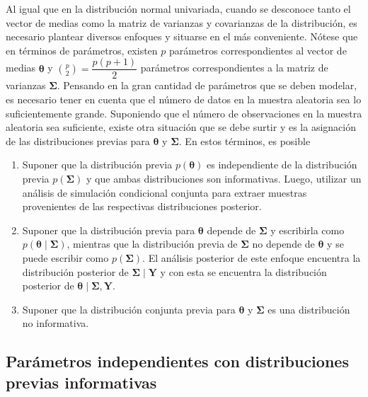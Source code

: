 \documentclass[
  10pt,
  spanish,
]{book}
\providecommand{\tightlist}{%
  \setlength{\itemsep}{0pt}\setlength{\parskip}{0pt}}
\theoremstyle{definition}
\theoremstyle{definition}
\theoremstyle{definition}
\theoremstyle{definition}
\theoremstyle{remark}
\begin{document}
Al igual que en la distribución normal univariada, cuando se desconoce tanto el vector de medias como la matriz de varianzas y covarianzas de la distribución, es necesario plantear diversos enfoques y situarse en el más conveniente. Nótese que en términos de parámetros, existen \(p\) parámetros correspondientes al vector de medias \(\boldsymbol \theta\) y \(\binom{p}{2}=\dfrac{p(p+1)}{2}\) parámetros correspondientes a la matriz de varianzas \(\boldsymbol \Sigma\). Pensando en la gran cantidad de parámetros que se deben modelar, es necesario tener en cuenta que el número de datos en la muestra aleatoria sea lo suficientemente grande. Suponiendo que el número de observaciones en la muestra aleatoria sea suficiente, existe otra situación que se debe surtir y es la asignación de las distribuciones previas para \(\boldsymbol \theta\) y \(\boldsymbol \Sigma\). En estos términos, es posible

\begin{enumerate}
\def\labelenumi{\arabic{enumi}.}
\tightlist
\item
  Suponer que la distribución previa \(p(\boldsymbol \theta)\) es independiente de la distribución previa \(p(\boldsymbol \Sigma)\) y que ambas distribuciones son informativas. Luego, utilizar un análisis de simulación condicional conjunta para extraer muestras provenientes de las respectivas distribuciones posterior.
\item
  Suponer que la distribución previa para \(\boldsymbol \theta\) depende de \(\boldsymbol \Sigma\) y escribirla como \(p(\boldsymbol \theta\mid \boldsymbol \Sigma)\), mientras que la distribución previa de \(\boldsymbol \Sigma\) no depende de \(\boldsymbol \theta\) y se puede escribir como \(p(\boldsymbol \Sigma)\). El análisis posterior de este enfoque encuentra la distribución posterior de \(\boldsymbol \Sigma\mid \mathbf{Y}\) y con esta se encuentra la distribución posterior de \(\boldsymbol \theta\mid \boldsymbol \Sigma,\mathbf{Y}\).
\item
  Suponer que la distribución conjunta previa para \(\boldsymbol \theta\) y \(\boldsymbol \Sigma\) es una distribución no informativa.
\end{enumerate}

\hypertarget{paruxe1metros-independientes-con-distribuciones-previas-informativas}{%
\subsection{Parámetros independientes con distribuciones previas informativas}\label{paruxe1metros-independientes-con-distribuciones-previas-informativas}}
\end{document}
